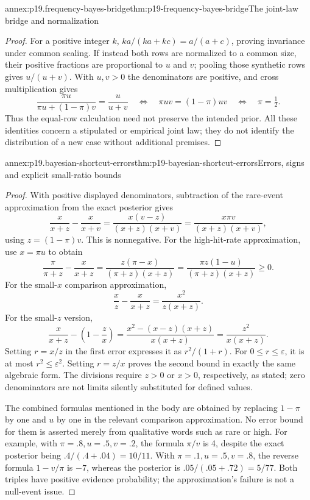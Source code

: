\begin{annexitem}{annex:p19.frequency-bayes-bridge}{thm:p19-frequency-bayes-bridge}{The joint-law bridge and normalization}
\begin{proof}
For a positive integer \(k\),
\(ka/(ka+kc)=a/(a+c)\), proving invariance under common scaling.
If instead both rows are normalized to a common size, their positive
fractions are proportional to \(u\) and \(v\); pooling those synthetic
rows gives \(u/(u+v)\). With \(u,v>0\) the denominators are positive,
and cross multiplication gives
\[
 \frac{\pi u}{\pi u+(1-\pi)v}=\frac{u}{u+v}
 \quad\Longleftrightarrow\quad
 \pi uv=(1-\pi)uv
 \quad\Longleftrightarrow\quad \pi=\tfrac12.
\]
Thus the equal-row calculation need not preserve the intended prior.
All these identities concern a stipulated or empirical joint law; they
do not identify the distribution of a new case without additional premises.
\end{proof}
\end{annexitem}

\begin{annexitem}{annex:p19.bayesian-shortcut-errors}{thm:p19-bayesian-shortcut-errors}{Errors, signs and explicit small-ratio bounds}
\begin{proof}
With positive displayed denominators, subtraction of the rare-event
approximation from the exact posterior gives
\[
 \frac{x}{x+z}-\frac{x}{x+v}
 =\frac{x(v-z)}{(x+z)(x+v)}
 =\frac{x\pi v}{(x+z)(x+v)},
\]
using \(z=(1-\pi)v\). This is nonnegative. For the high-hit-rate
approximation, use \(x=\pi u\) to obtain
\[
 \frac{\pi}{\pi+z}-\frac{x}{x+z}
 =\frac{z(\pi-x)}{(\pi+z)(x+z)}
 =\frac{\pi z(1-u)}{(\pi+z)(x+z)}\geq0.
\]
For the small-\(x\) comparison approximation,
\[
 \frac{x}{z}-\frac{x}{x+z}=\frac{x^2}{z(x+z)}.
\]
For the small-\(z\) version,
\[
 \frac{x}{x+z}-\left(1-\frac{z}{x}\right)
 =\frac{x^2-(x-z)(x+z)}{x(x+z)}
 =\frac{z^2}{x(x+z)}.
\]
Setting \(r=x/z\) in the first error expresses it as
\(r^2/(1+r)\). For \(0\leq r\leq\varepsilon\), it is at most
\(r^2\leq\varepsilon^2\). Setting \(r=z/x\) proves the second
bound in exactly the same algebraic form. The divisions require \(z>0\)
or \(x>0\), respectively, as stated; zero denominators are not limits
silently substituted for defined values.

The combined formulas mentioned in the body are obtained by replacing
\(1-\pi\) by one and \(u\) by one in the relevant comparison
approximation. No error bound for them is asserted merely from qualitative
words such as rare or high. For example, with \(\pi=.8,u=.5,v=.2\),
the formula \(\pi/v\) is 4, despite the exact posterior being
\(.4/(.4+.04)=10/11\). With \(\pi=.1,u=.5,v=.8\), the reverse
formula \(1-v/\pi\) is \(-7\), whereas the posterior is
\(.05/(.05+.72)=5/77\). Both triples have positive evidence probability;
the approximation's failure is not a null-event issue.
\end{proof}
\end{annexitem}

